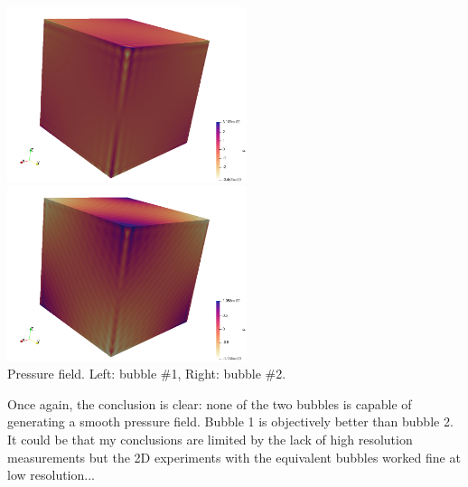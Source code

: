 \begin{center}
\includegraphics[width=7cm]{python_codes/fieldstone_75/results/mms3D/p_b1}
\includegraphics[width=7cm]{python_codes/fieldstone_75/results/mms3D/p_b2}\\
{\captionfont Pressure field. Left: bubble \#1, Right: bubble \#2.}
\end{center}

Once again, the conclusion is clear: none of the two bubbles is capable of generating a 
smooth pressure field. Bubble 1 is objectively better than bubble 2.
It could be that my conclusions are limited by the lack of high resolution measurements
but the 2D experiments with the equivalent bubbles worked fine at low resolution...
